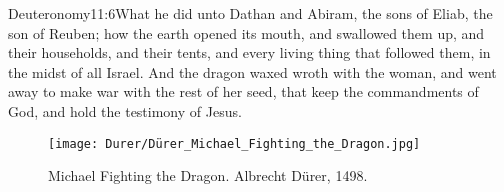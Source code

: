 				  {Deuteronomy}{11:6}{What he did unto Dathan and Abiram, the sons of Eliab, the son of Reuben; how the earth opened its mouth, and swallowed them up, and their households, and their tents, and every living thing that followed them, in the midst of all Israel.} %
And the dragon waxed wroth with the woman, and went away to make war with the rest of her seed, that keep the commandments of God, and hold the testimony of Jesus.%

\begin{figure*}[p]
  	\centering
  	\texttt{[image: Durer/Dürer\_Michael\_Fighting\_the\_Dragon.jpg]}
  	\caption[Michael Fighting the Dragon]{Michael Fighting the Dragon. Albrecht Dürer, 1498.}
  \end{figure*}

